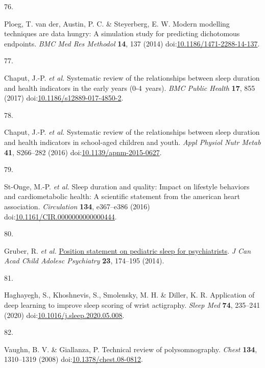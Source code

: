 \documentclass[
  9pt,
]{scrbook}
\newlength{\cslhangindent}
\newlength{\csllabelwidth}
\newlength{\cslentryspacingunit} %
\newenvironment{CSLReferences}[2] %
 {%
  \setlength{\parindent}{0pt}
  \ifodd #1
  \let\oldpar\par
  \def\par{\hangindent=\cslhangindent\oldpar}
  \fi
  \setlength{\parskip}{#2\cslentryspacingunit}
 }%
 {}
\newcommand{\CSLLeftMargin}[1]{\parbox[t]{\csllabelwidth}{#1}}
\newcommand{\CSLRightInline}[1]{\parbox[t]{\linewidth - \csllabelwidth}{#1}\break}
\begin{document}
\begin{CSLReferences}{0}{0}
\leavevmode{}%
\CSLLeftMargin{76. }%
\CSLRightInline{Ploeg, T. van der, Austin, P. C. \& Steyerberg, E. W.
Modern modelling techniques are data hungry: A simulation study for
predicting dichotomous endpoints. \emph{{BMC} Med Res Methodol}
\textbf{14}, 137 (2014)
doi:\href{https://doi.org/10.1186/1471-2288-14-137}{10.1186/1471-2288-14-137}.}

\leavevmode{}%
\CSLLeftMargin{77. }%
\CSLRightInline{Chaput, J.-P. \emph{et al.} Systematic review of the
relationships between sleep duration and health indicators in the early
years (0-4~years). \emph{{BMC} Public Health} \textbf{17}, 855 (2017)
doi:\href{https://doi.org/10.1186/s12889-017-4850-2}{10.1186/s12889-017-4850-2}.}

\leavevmode{}%
\CSLLeftMargin{78. }%
\CSLRightInline{Chaput, J.-P. \emph{et al.} Systematic review of the
relationships between sleep duration and health indicators in
school-aged children and youth. \emph{Appl Physiol Nutr Metab}
\textbf{41}, S266--282 (2016)
doi:\href{https://doi.org/10.1139/apnm-2015-0627}{10.1139/apnm-2015-0627}.}

\leavevmode{}%
\CSLLeftMargin{79. }%
\CSLRightInline{St-Onge, M.-P. \emph{et al.} Sleep duration and quality:
Impact on lifestyle behaviors and cardiometabolic health: A scientific
statement from the american heart association. \emph{Circulation}
\textbf{134}, e367--e386 (2016)
doi:\href{https://doi.org/10.1161/CIR.0000000000000444}{10.1161/CIR.0000000000000444}.}

\leavevmode{}%
\CSLLeftMargin{80. }%
\CSLRightInline{Gruber, R. \emph{et al.}
\href{https://www.ncbi.nlm.nih.gov/pmc/articles/PMC4197518}{Position
statement on pediatric sleep for psychiatrists}. \emph{J Can Acad Child
Adolesc Psychiatry} \textbf{23}, 174--195 (2014).}

\leavevmode{}%
\CSLLeftMargin{81. }%
\CSLRightInline{Haghayegh, S., Khoshnevis, S., Smolensky, M. H. \&
Diller, K. R. Application of deep learning to improve sleep scoring of
wrist actigraphy. \emph{Sleep Med} \textbf{74}, 235--241 (2020)
doi:\href{https://doi.org/10.1016/j.sleep.2020.05.008}{10.1016/j.sleep.2020.05.008}.}

\leavevmode{}%
\CSLLeftMargin{82. }%
\CSLRightInline{Vaughn, B. V. \& Giallanza, P. Technical review of
polysomnography. \emph{Chest} \textbf{134}, 1310--1319 (2008)
doi:\href{https://doi.org/10.1378/chest.08-0812}{10.1378/chest.08-0812}.}


\end{CSLReferences}
\end{document}
